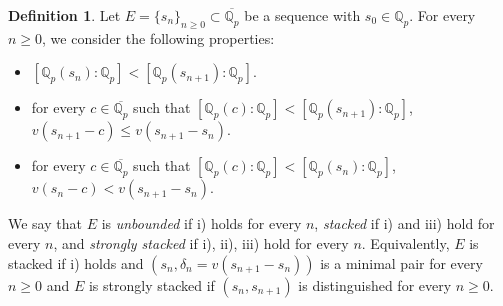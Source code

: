 \documentclass[10pt]{article}
\numberwithin{equation}{section}
\theoremstyle{definition}\newtheorem{Def}[equation]{Definition}
\theoremstyle{definition}\newtheorem{Ques}[equation]{Question}
\newcommand{\Q}{\mathbb{Q}}
\newcommand{\oQp}{\overline{\Q_p}}
\begin{document}
\begin{Def}\label{stacked}
Let $E=\{s_n\}_{n\geq0}\subset\oQp$ be a sequence with $s_0\in\Q_p$. For every $n\geq0$, we consider the following properties:
\begin{itemize}
\item[i)] $[\Q_p(s_n):\Q_p]<[\Q_p(s_{n+1}):\Q_p]$.
\item[ii)] for every $c\in\oQp$ such that $[\Q_p(c):\Q_p]<[\Q_p(s_{n+1}):\Q_p]$, $v(s_{n+1}-c)\leq v(s_{n+1}-s_n)$.
\item[iii)] for every $c\in\oQp$ such that $[\Q_p(c):\Q_p]<[\Q_p(s_{n}):\Q_p]$, $v(s_{n}-c)<v(s_{n+1}-s_n)$.
\end{itemize}
We say that $E$ is \emph{unbounded} if i) holds for every $n$, \emph{stacked} if i) and iii) hold for every $n$, and \emph{strongly stacked} if i), ii), iii) hold for every $n$. Equivalently, $E$ is stacked if i) holds and $(s_n,\delta_n=v(s_{n+1}-s_n))$ is a minimal pair for every $n\geq0$ and $E$ is strongly stacked if $(s_{n},s_{n+1})$ is distinguished for every $n\geq0$.
\end{Def}
\end{document}
